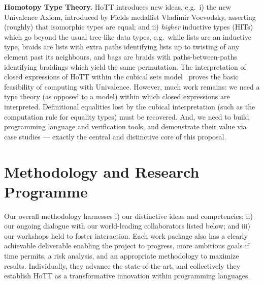 \documentclass[a4paper,11pt]{article}
\newcommand{\eg}{{e.g.}\ }
\begin{document}
{\bf Homotopy Type Theory.} HoTT introduces new ideas, \eg i) the new
Univalence Axiom, introduced by Fields medallist Vladimir Voevodsky,
asserting (roughly) that isomorphic types are equal; and ii)
\emph{higher} inductive types (HITs) which go beyond the usual
tree-like data types, \eg while lists are an inductive type, braids
are lists with extra paths identifying lists up to twisting of any
element past its neighbours, and bags are braids with
paths-between-paths identifying braidings which yield the same
permutation.  The interpretation of closed expressions of HoTT within
the cubical sets model~\cite{BezemM:cubsmt, nominal} proves the basic
feasibility of computing with Univalence.  However, much work remains:
we need a type theory (as opposed to a model) within which closed
expressions are interpreted.  Definitional equalities lost by the
cubical interpretation (such as the computation rule for equality
types) must be recovered. And, we need to build programming
language and verification tools, and demonstrate their value via case
studies --- exactly the central and distinctive core of this proposal.

\vspace*{-0.2in}

\section{Methodology and Research Programme}
\vspace*{-0.1in}

Our overall methodology harnesses i) our distinctive ideas and
competencies; ii) our ongoing dialogue with our world-leading
collaborators listed below; and iii) our workshops held to foster
interaction. Each work package also has a clearly achievable
deliverable enabling the project to progress, more ambitious goals if
time permits, a risk analysis, and an appropriate methodology to
maximize results. Individually, they advance the state-of-the-art, and
collectively they establish HoTT as a transformative innovation within
programming languages.
\end{document}
